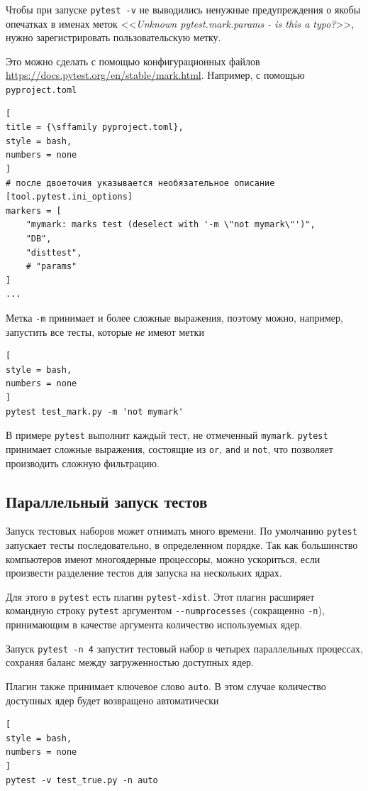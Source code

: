 \documentclass[%
	11pt,
	a4paper,
	utf8,
		]{article}
\begin{document}
Чтобы при запуске \texttt{pytest -v} не выводились ненужные предупреждения о якобы опечатках в именах меток <<\emph{Unknown pytest.mark.params - is this a typo?}>>, нужно зарегистрировать пользовательскую метку. 

Это можно сделать с помощью конфигурационных файлов \url{https://docs.pytest.org/en/stable/mark.html}. Например, с помощью \texttt{pyproject.toml}
\begin{lstlisting}[
title = {\sffamily pyproject.toml},
style = bash,
numbers = none	
]
# после двоеточия указывается необязательное описание
[tool.pytest.ini_options]
markers = [
    "mymark: marks test (deselect with '-m \"not mymark\"')",
    "DB",
    "disttest",
    # "params"
]
...
\end{lstlisting}

Метка \verb|-m| принимает и более сложные выражения, поэтому можно, например, запустить все тесты, которые \textit{не} имеют метки
\begin{lstlisting}[
style = bash,
numbers = none	
]
pytest test_mark.py -m 'not mymark'
\end{lstlisting}

В примере \texttt{pytest} выполнит каждый тест, не отмеченный \texttt{mymark}. \texttt{pytest} принимает сложные выражения, состоящие из \texttt{or}, \texttt{and} и \texttt{not}, что позволяет производить сложную фильтрацию.

\subsection{Параллельный запуск тестов}

Запуск тестовых наборов может отнимать много времени. По умолчанию \texttt{pytest} запускает тесты последовательно, в определенном порядке. Так как большинство компьютеров имеют многоядерные процессоры, можно ускориться, если произвести разделение тестов для запуска на нескольких ядрах.

Для этого в \texttt{pytest} есть плагин \texttt{pytest-xdist}. Этот плагин расширяет командную строку \texttt{pytest} аргументом \verb|--numprocesses| (сокращенно \verb|-n|), принимающим в качестве аргумента количество используемых ядер.

Запуск \texttt{pytest -n 4} запустит тестовый набор в четырех параллельных процессах, сохраняя баланс между загруженностью доступных ядер.

Плагин также принимает ключевое слово \texttt{auto}. В этом случае количество доступных ядер будет возвращено автоматически
\begin{lstlisting}[
style = bash,
numbers = none	
]
pytest -v test_true.py -n auto
\end{lstlisting}
\end{document}
